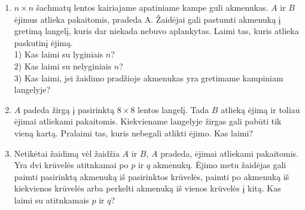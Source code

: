 \begin{enumerate}

\item  $n\times n$ šachmatų lentos kairiajame apatiniame kampe guli akmenukas. $A$ ir $B$ ėjimus atlieka pakaitomis, pradeda A. Žaidėjai gali pastumti akmenuką į gretimą langelį, kuris dar niekada nebuvo aplankytas. Laimi tas, kuris atlieka paskutinį ėjimą.\\
  1) Kas laimi su lyginiais $n$? \\
  2) Kas laimi su nelyginiais $n$? \\
  3) Kas laimi, jei žaidimo pradžioje akmenukas yra gretimame kampiniam langelyje?

%
%

\item $A$ padeda žirgą  į pasirinktą  $8\times 8$ lentos langelį. Tada $B$
  atlieką ėjimą ir toliau ėjimai atliekami pakaitomis. Kiekviename
  langelyje žirgas gali pabūti tik vieną kartą. Pralaimi tas, kuris
  nebegali atlikti ėjimo. Kas laimi?


\item Netikėtai žaidimą vėl žaidžia $A$ ir $B$, $A$ pradeda, ėjimai atliekami pakaitomis. Yra dvi krūvelės atitnkamai po $p$ ir $q$ akmenukų. Ėjimo metu žaidėjas gali paimti pasirinktą akmenuką iš pasirinktos krūvelės, paimti po akmenuką iš kiekvienos krūvelės arba perkelti akmenuką iš vienos krūvelės į kitą. Kas laimi su atitnkamais $p$ ir $q$?


\end{enumerate}
